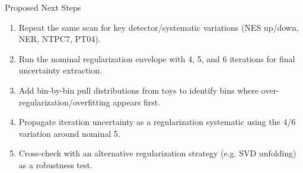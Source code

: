 \documentclass[aspectratio=169]{beamer}
\begin{document}
\begin{frame}{Proposed Next Steps}
\begin{enumerate}
  \item Repeat the same scan for key detector/systematic variations (NES up/down, NER, NTPC7, PT04).
  \item Run the nominal regularization envelope with 4, 5, and 6 iterations for final uncertainty extraction.
  \item Add bin-by-bin pull distributions from toys to identify bins where over-regularization/overfitting appears first.
  \item Propagate iteration uncertainty as a regularization systematic using the 4/6 variation around nominal 5.
  \item Cross-check with an alternative regularization strategy (e.g. SVD unfolding) as a robustness test.
\end{enumerate}
\end{frame}
\end{document}

